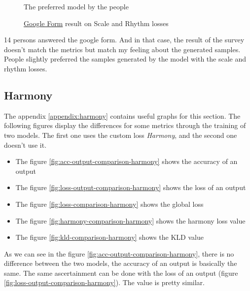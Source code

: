 \documentclass[12pt]{report}
\begin{document}
\begin{figure}
    \begin{center}
    \caption{\href{https://docs.google.com/forms/d/e/1FAIpQLSckCvIg1mZdXlh1fSv_yG68dEbfQRN-WwkGG2KVdcjQ4rQgbw/viewform?usp=sf_link}{Google Form} result on Scale and Rhythm losses}
    The preferred model by the people
    \label{fig:pie:scale-loss}
    \end{center}
\end{figure}

14 persons answered the google form.
And in that case, the result of the survey doesn't match the metrics but match my feeling about the generated samples.
People slightly preferred the samples generated by the model with the scale and rhythm losses.



\subsection{Harmony}
\label{sec:exp:harmony}

The appendix \ref{appendix:harmony} contains useful graphs for this section.
The following figures display the differences for some metrics through the training of two models.
The first one uses the custom loss \textit{Harmony}, and the second one doesn't use it.
\begin{itemize}
    \item The figure \ref{fig:acc-output-comparison-harmony} shows the accuracy of an output
    \item The figure \ref{fig:loss-output-comparison-harmony} shows the loss of an output
    \item The figure \ref{fig:loss-comparison-harmony} shows the global loss
    \item The figure \ref{fig:harmony-comparison-harmony} shows the harmony loss value
    \item The figure \ref{fig:kld-comparison-harmony} shows the KLD value
\end{itemize}


As we can see in the figure \ref{fig:acc-output-comparison-harmony}, there is no difference between the two models, the accuracy of an output is basically the same.
The same ascertainment can be done with the loss of an output (figure \ref{fig:loss-output-comparison-harmony}).
The value is pretty similar.
\end{document}
